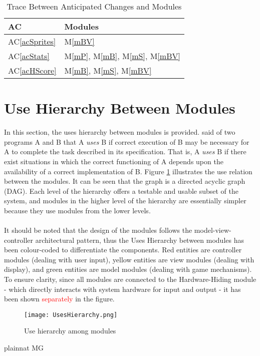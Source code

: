 \documentclass[12pt, titlepage]{article}
\newcommand{\acref}[1]{AC\ref{#1}}
\newcommand{\mref}[1]{M\ref{#1}}
\begin{document}
\begin{table}[H]
\centering
\begin{tabular}{p{} p{}}
\toprule
\textbf{AC} & \textbf{Modules}\\
\midrule
\acref{acSprites} & \mref{mBV}\\
\acref{acStats} & \mref{mP}, \mref{mB}, \mref{mS}, \mref{mBV}\\
\acref{acHScore} & \mref{mB}, \mref{mS}, \mref{mBV}\\
\bottomrule
\end{tabular}
\caption{Trace Between Anticipated Changes and Modules}
\label{TblACT}
\end{table}

\section{Use Hierarchy Between Modules} \label{SecUse}

In this section, the uses hierarchy between modules is
provided. \citet{Parnas1978} said of two programs A and B that A {\em uses} B if
correct execution of B may be necessary for A to complete the task described in
its specification. That is, A {\em uses} B if there exist situations in which
the correct functioning of A depends upon the availability of a correct
implementation of B.  Figure \ref{FigUH} illustrates the use relation between
the modules. It can be seen that the graph is a directed acyclic graph
(DAG). Each level of the hierarchy offers a testable and usable subset of the
system, and modules in the higher level of the hierarchy are essentially simpler
because they use modules from the lower levels.\\\\
\noindent It should be noted that the design of the modules follows the model-view-controller
architectural pattern, thus the Uses Hierarchy between modules has been colour-coded to differentiate
the components. Red entities are controller modules (dealing with user input), yellow entities are view 
modules (dealing with display), and green entities are model modules (dealing with game mechanisms).
To ensure clarity, since all modules are connected to the Hardware-Hiding module - which directly interacts
with system hardware for input and output - it has been shown \textcolor{red}{separately} in the figure. \\
\begin{figure}[H]
\centering
\texttt{[image: UsesHierarchy.png]}
\caption{Use hierarchy among modules}
\label{FigUH}
\end{figure}

\newpage
 {plainnat}
 {MG}
\end{document}
